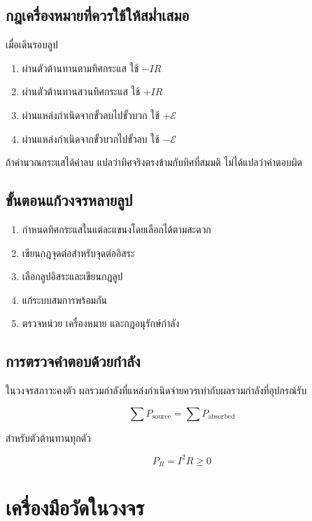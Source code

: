 \subsection{กฎเครื่องหมายที่ควรใช้ให้สม่ำเสมอ}

เมื่อเดินรอบลูป

\begin{enumerate}
    \item ผ่านตัวต้านทานตามทิศกระแส ใช้ $-IR$
    \item ผ่านตัวต้านทานสวนทิศกระแส ใช้ $+IR$
    \item ผ่านแหล่งกำเนิดจากขั้วลบไปขั้วบวก ใช้ $+\mathcal{E}$
    \item ผ่านแหล่งกำเนิดจากขั้วบวกไปขั้วลบ ใช้ $-\mathcal{E}$
\end{enumerate}

ถ้าคำนวณกระแสได้ค่าลบ แปลว่าทิศจริงตรงข้ามกับทิศที่สมมติ ไม่ได้แปลว่าคำตอบผิด

\subsection{ขั้นตอนแก้วงจรหลายลูป}

\begin{enumerate}
    \item กำหนดทิศกระแสในแต่ละแขนงโดยเลือกได้ตามสะดวก
    \item เขียนกฎจุดต่อสำหรับจุดต่ออิสระ
    \item เลือกลูปอิสระและเขียนกฎลูป
    \item แก้ระบบสมการพร้อมกัน
    \item ตรวจหน่วย เครื่องหมาย และกฎอนุรักษ์กำลัง
\end{enumerate}

\subsection{การตรวจคำตอบด้วยกำลัง}

ในวงจรสภาวะคงตัว ผลรวมกำลังที่แหล่งกำเนิดจ่ายควรเท่ากับผลรวมกำลังที่อุปกรณ์รับ

\[
\sum P_{\text{source}}=\sum P_{\text{absorbed}}
\]

สำหรับตัวต้านทานทุกตัว

\[
P_R=I^2R\geq 0
\]

\section{เครื่องมือวัดในวงจร}

